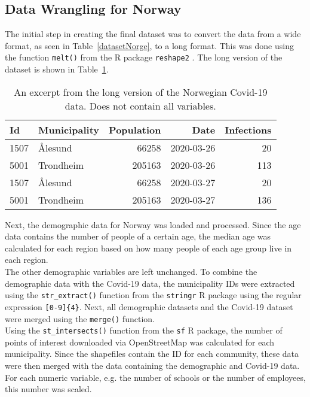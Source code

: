 \subsection{Data Wrangling for Norway}
The initial step in creating the final dataset was to convert the data from a wide format, as seen in Table~\ref{datasetNorge}, to a long format. This was done using the function \texttt{melt()} from the R package \texttt{reshape2} \autocite[][]{reshape2}. The long version of the dataset is shown in Table~\ref{norwayLong}.
\begin{table}[H] 
\caption{An excerpt from the long version of the Norwegian Covid-19 data. Does not contain all variables.\label{norwayLong}}
\begin{tabular}{l l r r r}
\toprule
\textbf{Id}	& \textbf{Municipality}	& \textbf{Population} & \textbf{Date} & \textbf{Infections}\\
\midrule
1507 & Ålesund & 66258 & 2020-03-26 & 20\\
5001 & Trondheim  & 205163  & 2020-03-26 & 113\\
1507 & Ålesund & 66258 & 2020-03-27 & 20\\
5001 & Trondheim  & 205163  & 2020-03-27 & 136\\
\bottomrule
\end{tabular}
\end{table}
Next, the demographic data for Norway was loaded and processed. Since the age data contains the number of people of a certain age, the median age was calculated for each region based on how many people of each age group live in each region. \\
The other demographic variables are left unchanged. To combine the demographic data with the Covid-19 data, the municipality IDs were extracted using the \texttt{str\_extract()} function from the \texttt{stringr} \autocite[][]{stringr} R package using the regular expression \texttt{[0-9]\{4\}}. Next, all demographic datasets and the Covid-19 dataset were merged using the \texttt{merge()} function. \\
Using the \texttt{st\_intersects()} function from the \texttt{sf} \autocite[][]{sf} R package, the number of points of interest downloaded via OpenStreetMap was calculated for each municipality. Since the shapefiles contain the ID for each community, these data were then merged with the data containing the demographic and Covid-19 data. \\
For each numeric variable, e.g. the number of schools or the number of employees, this number was scaled. \\
